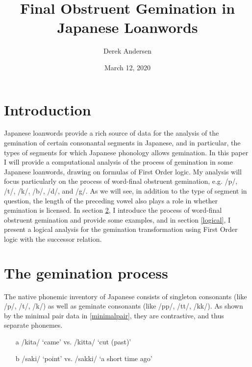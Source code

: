 \documentclass{article}
\title{Final Obstruent Gemination in Japanese Loanwords}
\author{Derek Andersen}
\date{March 12, 2020}
\begin{document}
\maketitle

\section{Introduction}
Japanese loanwords provide a rich source of data for the analysis of the gemination of certain consonantal segments in Japanese, and in  particular, the types of segments for which Japanese phonology allows gemination. In this paper I will provide a computational analysis of the process of gemination in some Japanese loanwords, drawing on formulas of First Order logic. My analysis will focus particularly on the process of word-final obstruent gemination, e.g. /p/, /t/, /k/, /b/, /d/, and /g/. As we will see, in addition to the type of segment in question, the length of the preceding vowel also plays a role in whether gemination is licensed. In section \ref{gemprocess}, I introduce the process of word-final obstruent gemination and provide some examples, and in section \ref{logical}, I present a logical analysis for the gemination transformation using First Order logic with the successor relation.

\section{The gemination process}
\label{gemprocess}
The native phonemic inventory of Japanese consists of singleton consonants (like /p/, /t/, /k/) as well as geminate consonants (like /pp/, /tt/, /kk/). As shown by the minimal pair data in \ref{minimalpair}, they are contrastive, and thus separate phonemes. \cite{Kubozono2009}

\begin{exe}
    \ex
    \label{minimalpair}
    \begin{itemize}
        \item [a] /kita/ ‘came' vs. /kitta/ ‘cut (past)'
        \item [b] /saki/ ‘point' vs. /sakki/ ‘a short time ago'
    \end{itemize}
    
\end{exe}
\end{document}
